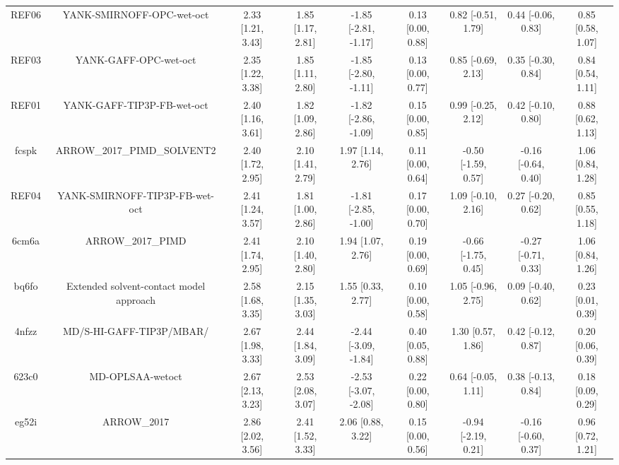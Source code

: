 \documentclass{article}
\begin{document}
\begin{center}
\begin{longtable}{|ccccccccc|}
 REF06 &                          YANK-SMIRNOFF-OPC-wet-oct &  2.33 [1.21, 3.43] &  1.85 [1.17, 2.81] &  -1.85 [-2.81, -1.17] &  0.13 [0.00, 0.88] &   0.82 [-0.51, 1.79] &   0.44 [-0.06, 0.83] &     0.85 [0.58, 1.07] \\
 REF03 &                              YANK-GAFF-OPC-wet-oct &  2.35 [1.22, 3.38] &  1.85 [1.11, 2.80] &  -1.85 [-2.80, -1.11] &  0.13 [0.00, 0.77] &   0.85 [-0.69, 2.13] &   0.35 [-0.30, 0.84] &     0.84 [0.54, 1.11] \\
 REF01 &                         YANK-GAFF-TIP3P-FB-wet-oct &  2.40 [1.16, 3.61] &  1.82 [1.09, 2.86] &  -1.82 [-2.86, -1.09] &  0.15 [0.00, 0.85] &   0.99 [-0.25, 2.12] &   0.42 [-0.10, 0.80] &     0.88 [0.62, 1.13] \\
 fcspk &                        ARROW\_2017\_PIMD\_SOLVENT2 &  2.40 [1.72, 2.95] &  2.10 [1.41, 2.79] &     1.97 [1.14, 2.76] &  0.11 [0.00, 0.64] &  -0.50 [-1.59, 0.57] &  -0.16 [-0.64, 0.40] &     1.06 [0.84, 1.28] \\
 REF04 &                     YANK-SMIRNOFF-TIP3P-FB-wet-oct &  2.41 [1.24, 3.57] &  1.81 [1.00, 2.86] &  -1.81 [-2.85, -1.00] &  0.17 [0.00, 0.70] &   1.09 [-0.10, 2.16] &   0.27 [-0.20, 0.62] &     0.85 [0.55, 1.18] \\
 6cm6a &                                  ARROW\_2017\_PIMD &  2.41 [1.74, 2.95] &  2.10 [1.40, 2.80] &     1.94 [1.07, 2.76] &  0.19 [0.00, 0.69] &  -0.66 [-1.75, 0.45] &  -0.27 [-0.71, 0.33] &     1.06 [0.84, 1.26] \\
 bq6fo &            Extended solvent-contact model approach &  2.58 [1.68, 3.35] &  2.15 [1.35, 3.03] &     1.55 [0.33, 2.77] &  0.10 [0.00, 0.58] &   1.05 [-0.96, 2.75] &   0.09 [-0.40, 0.62] &     0.23 [0.01, 0.39] \\
 4nfzz &                           MD/S-HI-GAFF-TIP3P/MBAR/ &  2.67 [1.98, 3.33] &  2.44 [1.84, 3.09] &  -2.44 [-3.09, -1.84] &  0.40 [0.05, 0.88] &    1.30 [0.57, 1.86] &   0.42 [-0.12, 0.87] &     0.20 [0.06, 0.39] \\
 623c0 &                                   MD-OPLSAA-wetoct &  2.67 [2.13, 3.23] &  2.53 [2.08, 3.07] &  -2.53 [-3.07, -2.08] &  0.22 [0.00, 0.80] &   0.64 [-0.05, 1.11] &   0.38 [-0.13, 0.84] &     0.18 [0.09, 0.29] \\
 eg52i &                                        ARROW\_2017 &  2.86 [2.02, 3.56] &  2.41 [1.52, 3.33] &     2.06 [0.88, 3.22] &  0.15 [0.00, 0.56] &  -0.94 [-2.19, 0.21] &  -0.16 [-0.60, 0.37] &     0.96 [0.72, 1.21] \\

\end{longtable}
\end{center}
\end{document}
